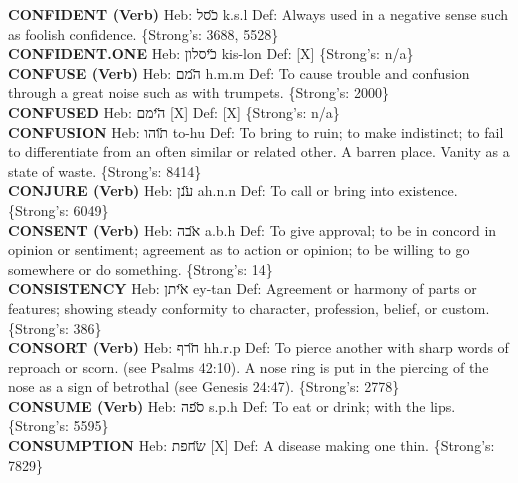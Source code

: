 {\textbf{CONFIDENT (Verb)} Heb: {\large\H כסל} k.s.l Def: Always used in a negative sense such as foolish confidence. \{Strong's: 3688, 5528\}\hfill{}\\

\textbf{CONFIDENT.ONE} Heb: {\large\H כיסלון} kis-lon Def: {[}X{]} \{Strong's: n/a\}\hfill{}\\

\textbf{CONFUSE (Verb)} Heb: {\large\H המם} h.m.m Def: To cause trouble and confusion through a great noise such as with trumpets. \{Strong's: 2000\}\hfill{}\\

\textbf{CONFUSED} Heb: {\large\H הימם} {[}X{]} Def: {[}X{]} \{Strong's: n/a\}\hfill{}\\

\textbf{CONFUSION} Heb: {\large\H תוהו} to-hu Def: To bring to ruin; to make indistinct; to fail to differentiate from an often similar or related other. A barren place. Vanity as a state of waste. \{Strong's: 8414\}\hfill{}\\

\textbf{CONJURE (Verb)} Heb: {\large\H ענן} ah.n.n Def: To call or bring into existence. \{Strong's: 6049\}\hfill{}\\

\textbf{CONSENT (Verb)} Heb: {\large\H אבה} a.b.h Def: To give approval; to be in concord in opinion or sentiment; agreement as to action or opinion; to be willing to go somewhere or do something. \{Strong's: 14\}\hfill{}\\

\textbf{CONSISTENCY} Heb: {\large\H איתן} ey-tan Def: Agreement or harmony of parts or features; showing steady conformity to character, profession, belief, or custom. \{Strong's: 386\}\hfill{}\\

\textbf{CONSORT (Verb)} Heb: {\large\H חרף} hh.r.p Def: To pierce another with sharp words of reproach or scorn. (see Psalms 42:10). A nose ring is put in the piercing of the nose as a sign of betrothal (see Genesis 24:47). \{Strong's: 2778\}\hfill{}\\

\textbf{CONSUME (Verb)} Heb: {\large\H ספה} s.p.h Def: To eat or drink; with the lips. \{Strong's: 5595\}\hfill{}\\

\textbf{CONSUMPTION} Heb: {\large\H שחפת} {[}X{]} Def: A disease making one thin. \{Strong's: 7829\}\hfill{}\\

}
